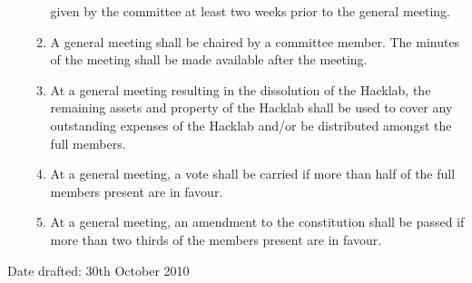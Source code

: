 \documentclass{article}
\begin{document}
\begin{enumerate}
\begin{enumerate}
        given by the committee at least two weeks prior to the general
        meeting.
      \item A general meeting shall be chaired by a committee
        member. The minutes of the meeting shall be made available
        after the meeting.
      \item At a general meeting resulting in the dissolution of the
        Hacklab, the remaining assets and property of the Hacklab
        shall be used to cover any outstanding expenses of the Hacklab
        and/or be distributed amongst the full members.
      \item At a general meeting, a vote shall be carried if more than
        half of the full members present are in favour.
      \item At a general meeting, an amendment to the constitution
        shall be passed if more than two thirds of the members present
        are in favour.
      \end{enumerate}
      
\end{enumerate}
\bigskip
Date drafted: 30th October 2010
\end{document}
